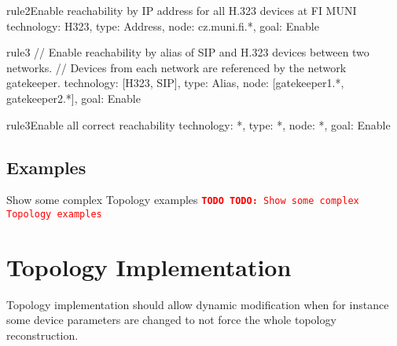 \documentclass[a4paper]{report}
\newcommand{\TODO}[1]{%
\def\empty{}%
\def\prvniparametr{#1}%
\ifx\prvniparametr\empty%
\begingroup\tt\textcolor{red}{\noindent\textbf{TODO}}\endgroup
\else%
\begingroup\tt\textcolor{red}{\noindent\textbf{TODO:}\ #1}\endgroup
\fi%
}
\begin{document}
\begin{TopologyExample}{rule2}{Enable reachability by IP address for all H.323 devices at FI MUNI}
technology: H323,
type: Address,
node: cz.muni.fi.*,
goal: Enable
\end{TopologyExample}

\begin{TopologyExample}{rule3}{}
// Enable reachability by alias of SIP and H.323 devices between two networks.
// Devices from each network are referenced by the network gatekeeper.
technology: [H323, SIP],
type: Alias,
node: [gatekeeper1.*, gatekeeper2.*],
goal: Enable
\end{TopologyExample}

\begin{TopologyExample}{rule3}{Enable all correct reachability}
technology: *,
type: *,
node: *,
goal: Enable
\end{TopologyExample}


\section{Examples}

\TODO{Show some complex Topology examples}




\chapter{Topology Implementation}

Topology implementation should allow dynamic modification when for instance some device parameters are changed to not force the whole topology reconstruction.      
      
\end{document}
